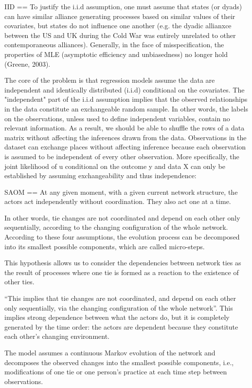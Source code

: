 IID
==
To justify the i.i.d assumption, one must assume that states (or dyads) can have similar alliance generating processes based on similar values of their covariates, but states do not influence one another (e.g. the dyadic allianxce between the US and UK during the Cold War was entirely unrelated to other contemporaneous alliances). Generally, in the face of misspecification, the properties of MLE (asymptotic efficiency and unbiasedness) no longer hold (Greene, 2003).

The core of the problem is that regression models assume the data are independent and identically distributed (i.i.d) conditional on the covariates. The "independent" part of the i.i.d assumption implies that the observed relationships in the data constitute an exchangeable random sample. In other words, the labels on the observations, unless used to define independent variables, contain no relevant information. As a result, we should be able to shuffle the rows of a data matrix without affecting the inferences drawn from the data. Observations in the dataset can exchange places without affecting inference because each observation is assumed to be independent of every other observation. More specifically, the joint likelihood of u conditional on the outcome y and data X can only be established by assuming exchangeability and thus independence:

SAOM
==
At any given moment, with a given current network structure, the actors act independently without coordination. They also act one at a time. 

In other words, tie changes are not coordinated and depend on each other only sequentially, according to the changing configuration of the whole network. According to these four assumptions, the evolution process can be decomposed into its smallest possible components, which are called micro-steps.

This hypothesis allows us to consider the dependencies between network ties as the result of processes where one tie is formed as a reaction to the existence of other ties.

“This implies that tie changes are not coordinated, and depend on each other only sequentially, via the changing configuration of the whole network”. This implies strong dependence between what the actors do, but it is completely generated by the time order: the actors are dependent because they constitute each other's changing environment.

The model assumes a continuous Markov evolution of the network and decomposes the observed changes into the smallest possible components, i.e., modifications of one tie or one person’s practice at each time step between observations.

